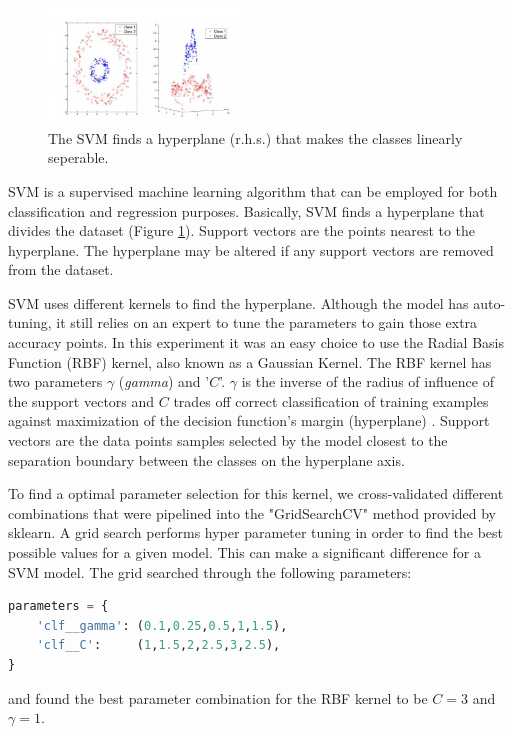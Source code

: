 \begin{figure}[H]
    \centering
    \includegraphics[width=0.45\textwidth]{pictures/SVM.png}
    \caption{The SVM finds a hyperplane (r.h.s.) that makes the classes linearly seperable.}
    \label{fig:SVM}
\end{figure}

SVM is a supervised machine learning algorithm that can be employed for both classification and regression purposes. Basically, SVM finds a hyperplane that divides the dataset (Figure \ref{fig:SVM}). Support vectors are the points nearest to the hyperplane. The hyperplane may be altered if any support vectors are removed from the dataset.

SVM uses different kernels to find the hyperplane. Although the model has auto-tuning, it still relies on an expert to tune the parameters to gain those extra accuracy points. In this experiment it was an easy choice to use the Radial Basis Function (RBF) kernel, also known as a Gaussian Kernel. The RBF kernel has two parameters $\gamma$ (\textit{gamma}) and '$C$'. $\gamma$ is the inverse of the radius of influence of the support vectors and $C$ trades off correct classification of training examples against maximization of the decision function’s margin (hyperplane) \cite{scikit-learn}. Support vectors are the data points samples selected by the model closest to the separation boundary between the classes on the hyperplane axis. 

To find a optimal parameter selection for this kernel, we cross-validated different combinations that were pipelined into the "GridSearchCV" method provided by sklearn. A grid search performs hyper parameter tuning in order to find the best possible values for a given model. This can make a significant difference for a SVM model. The grid searched through the following parameters:
\begin{lstlisting}[language=Python]
parameters = {
    'clf__gamma': (0.1,0.25,0.5,1,1.5),
    'clf__C':     (1,1.5,2,2.5,3,2.5),
}   
\end{lstlisting}
and found the best parameter combination for the RBF kernel to be $C=3$ and $\gamma=1$.



